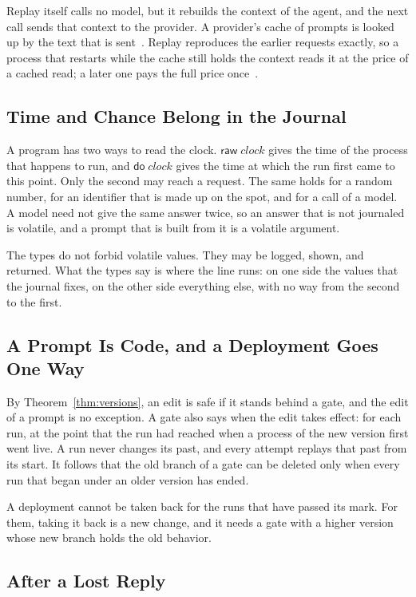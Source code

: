 \documentclass[acmsmall,nonacm,screen]{acmart}
\newcommand{\kw}[1]{\mathsf{#1}}
\newcommand{\nm}[1]{\mathit{#1}}
\begin{document}
Replay itself calls no model, but it rebuilds the context of the agent, and the next call
sends that context to the provider. A provider's cache of prompts is looked up by the text
that is sent~\citep{anthropic2026}. Replay reproduces the earlier requests exactly, so a
process that restarts while the cache still holds the context reads it at the price of a
cached read; a later one pays the full price once~\citep{tpp6}.

\subsection{Time and Chance Belong in the Journal}

A program has two ways to read the clock. $\kw{raw}\;\nm{clock}$ gives the time of the
process that happens to run, and $\kw{do}\;\nm{clock}$ gives the time at which the run first
came to this point. Only the second may reach a request. The same holds for a random number,
for an identifier that is made up on the spot, and for a call of a model. A model need not
give the same answer twice, so an answer that is not journaled is volatile, and a prompt that
is built from it is a volatile argument.

The types do not forbid volatile values. They may be logged, shown, and returned. What the
types say is where the line runs: on one side the values that the journal fixes, on the other
side everything else, with no way from the second to the first.

\subsection{A Prompt Is Code, and a Deployment Goes One Way}

By Theorem~\ref{thm:versions}, an edit is safe if it stands behind a gate, and the edit of a
prompt is no exception. A gate also says when the edit takes effect: for each run, at the
point that the run had reached when a process of the new version first went live. A run never
changes its past, and every attempt replays that past from its start. It follows that the
old branch of a gate can be deleted only when every run that began under an older version has
ended.

A deployment cannot be taken back for the runs that have passed its mark. For them, taking it
back is a new change, and it needs a gate with a higher version whose new branch holds the old
behavior.

\subsection{After a Lost Reply}
\end{document}
